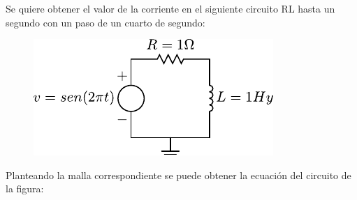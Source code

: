 \begin{questions}
    \question

    Se quiere obtener el valor de la corriente en el siguiente circuito RL hasta un segundo con un paso de un cuarto de segundo:

    \begin{figure}[ht!]
        \centering
        \includegraphics[width=.4\paperwidth]{circuit}
    \end{figure}

    Planteando la malla correspondiente se puede obtener la ecuación del circuito de la figura:


\end{questions}
